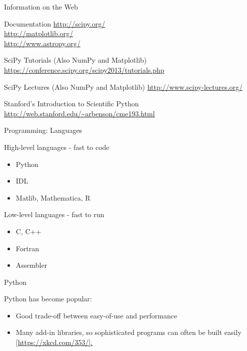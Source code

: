 \documentclass{beamer}
\begin{document}
\begin{frame}{Information on the Web}
  \begin{block}{Documentation}
    \url{http://scipy.org/} \\
    \url{http://matplotlib.org/} \\
    \url{http://www.astropy.org/}
  \end{block}

  \begin{block}{SciPy Tutorials (Also NumPy and Matplotlib)}
    \url{https://conference.scipy.org/scipy2013/tutorials.php}
  \end{block}
  
  \begin{block}{SciPy Lectures (Also NumPy and Matplotlib)}
    \url{http://www.scipy-lectures.org/}
  \end{block}
  
  \begin{block}{Stanford's Introduction to Scientific Python}
    \url{http://web.stanford.edu/~arbenson/cme193.html}
  \end{block}
  
\end{frame}

\begin{frame}{Programming: Languages}
  \begin{block}{High-level languages - fast to code}
    \begin{itemize}
      \item Python
      \item IDL
      \item Matlib, Mathematica, R
    \end{itemize}
    \end{block}
    \begin{block}{Low-level languages - fast to run}
    \begin{itemize}
      \item C, C++
      \item Fortran
      \item Assembler
    \end{itemize}
  \end{block}
\end{frame}

\begin{frame}{Python}
  \begin{block}{Python has become popular:}
    \begin{itemize}
      \item Good trade-off between easy-of-use and performance
      \item Many add-in libraries, so sophisticated programs can often be built easily [\url{https://xkcd.com/353/].}
    \end{itemize}
  \end{block}
\end{frame}
\end{document}
